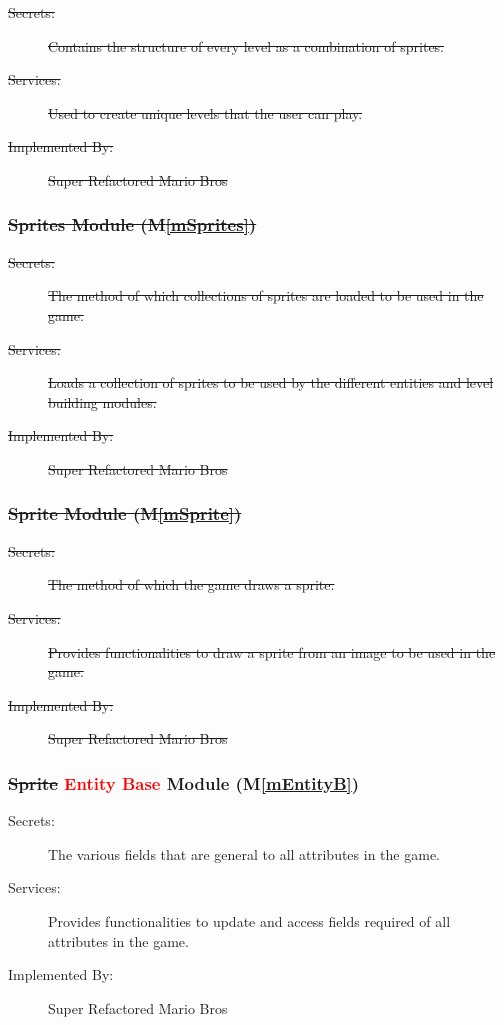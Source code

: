 \documentclass[12pt, titlepage]{article}
\newcommand{\mref}[1]{M\ref{#1}}
\begin{document}
\begin{description}
\item[\sout{Secrets:}] \sout{Contains the structure of every level as a combination of sprites.}
\item[\sout{Services:}] \sout{Used to create unique levels that the user can play.}
\item[\sout{Implemented By:}] \sout{Super Refactored Mario Bros}
\end{description}

\subsubsection{\sout{Sprites Module (\mref{mSprites})}}

\begin{description}
\item[\sout{Secrets:}] \sout{The method of which collections of sprites are loaded to be used in the game.}
\item[\sout{Services:}] \sout{Loads a collection of sprites to be used by the different entities and level building modules.}
\item[\sout{Implemented By:}] \sout{Super Refactored Mario Bros}
\end{description}

\subsubsection{\sout{Sprite Module (\mref{mSprite})}}

\begin{description}
\item[\sout{Secrets:}] \sout{The method of which the game draws a sprite.}
\item[\sout{Services:}] \sout{Provides functionalities to draw a sprite from an image to be used in the game.}
\item[\sout{Implemented By:}] \sout{Super Refactored Mario Bros}
\end{description}

\subsubsection{\sout{Sprite} \textcolor{red}{Entity Base} Module (\mref{mEntityB})}

\begin{description}
\item[Secrets:] The various fields that are general to all attributes in the game.
\item[Services:] Provides functionalities to update and access fields required of all attributes in the game.
\item[Implemented By:] Super Refactored Mario Bros
\end{description}
\end{document}
